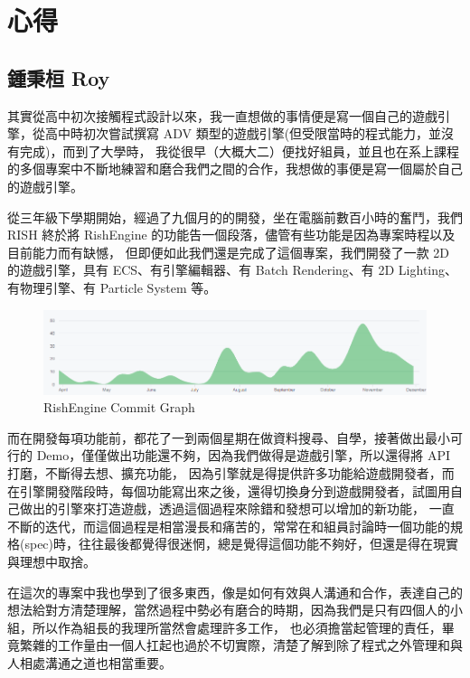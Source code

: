 \chapter{心得}

\section{鍾秉桓 Roy}
\label{sec:Roy}

其實從高中初次接觸程式設計以來，我一直想做的事情便是寫一個自己的遊戲引擎，從高中時初次嘗試撰寫 ADV 類型的遊戲引擎(但受限當時的程式能力，並沒有完成)，而到了大學時，
我從很早（大概大二）便找好組員，並且也在系上課程的多個專案中不斷地練習和磨合我們之間的合作，我想做的事便是寫一個屬於自己的遊戲引擎。

從三年級下學期開始，經過了九個月的的開發，坐在電腦前數百小時的奮鬥，我們 RISH 終於將 RishEngine 的功能告一個段落，儘管有些功能是因為專案時程以及目前能力而有缺憾，
但即便如此我們還是完成了這個專案，我們開發了一款 2D 的遊戲引擎，具有 ECS、有引擎編輯器、有 Batch Rendering、有 2D Lighting、有物理引擎、有 Particle System 等。

\begin{figure}[h]
    \begin{center}
    \includegraphics[width=\textwidth]{./resources/ch6/commit.png}
    \end{center}
\caption*{RishEngine Commit Graph}
\end{figure}

而在開發每項功能前，都花了一到兩個星期在做資料搜尋、自學，接著做出最小可行的 Demo，僅僅做出功能還不夠，因為我們做得是遊戲引擎，所以還得將 API 打磨，不斷得去想、擴充功能，
因為引擎就是得提供許多功能給遊戲開發者，而在引擎開發階段時，每個功能寫出來之後，還得切換身分到遊戲開發者，試圖用自己做出的引擎來打造遊戲，透過這個過程來除錯和發想可以增加的新功能，
一直不斷的迭代，而這個過程是相當漫長和痛苦的，常常在和組員討論時一個功能的規格(spec)時，往往最後都覺得很迷惘，總是覺得這個功能不夠好，但還是得在現實與理想中取捨。

在這次的專案中我也學到了很多東西，像是如何有效與人溝通和合作，表達自己的想法給對方清楚理解，當然過程中勢必有磨合的時期，因為我們是只有四個人的小組，所以作為組長的我理所當然會處理許多工作，
也必須擔當起管理的責任，畢竟繁雜的工作量由一個人扛起也過於不切實際，清楚了解到除了程式之外管理和與人相處溝通之道也相當重要。

